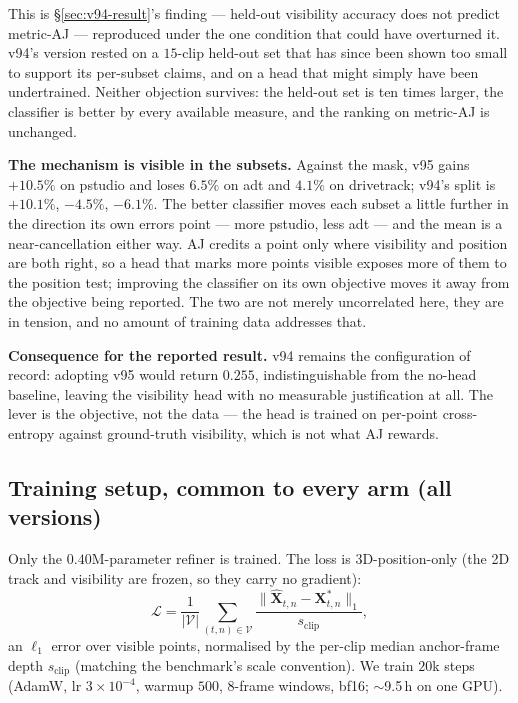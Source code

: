 \documentclass[11pt,a4paper]{article}
\begin{document}
This is \S\ref{sec:v94-result}'s finding --- held-out visibility accuracy does not predict
metric-AJ --- reproduced under the one condition that could have overturned it. v94's version
rested on a $15$-clip held-out set that has since been shown too small to support its per-subset
claims, and on a head that might simply have been undertrained. Neither objection survives: the
held-out set is ten times larger, the classifier is better by every available measure, and the
ranking on metric-AJ is unchanged.

\textbf{The mechanism is visible in the subsets.} Against the mask, v95 gains $+10.5\%$ on
pstudio and loses $6.5\%$ on adt and $4.1\%$ on drivetrack; v94's split is $+10.1\%$, $-4.5\%$,
$-6.1\%$. The better classifier moves each subset a little further in the direction its own
errors point --- more pstudio, less adt --- and the mean is a near-cancellation either way. AJ
credits a point only where visibility and position are both right, so a head that marks more
points visible exposes more of them to the position test; improving the classifier on its own
objective moves it away from the objective being reported. The two are not merely uncorrelated
here, they are in tension, and no amount of training data addresses that.

\textbf{Consequence for the reported result.} v94 remains the configuration of record: adopting
v95 would return $0.255$, indistinguishable from the no-head baseline, leaving the visibility head
with no measurable justification at all. The lever is the objective, not the data --- the head is
trained on per-point cross-entropy against ground-truth visibility, which is not what AJ rewards.

\subsection{Training setup, common to every arm (all versions)}
Only the $0.40$M-parameter refiner is trained. The loss is 3D-position-only (the 2D track and
visibility are frozen, so they carry no gradient):
\begin{equation}
\mathcal{L} = \frac{1}{|\mathcal{V}|}\sum_{(t,n)\in\mathcal{V}}
\frac{\lVert \hat{\mathbf X}_{t,n}-\mathbf X^{*}_{t,n}\rVert_1}{s_{\text{clip}}},
\end{equation}
an $\ell_1$ error over visible points, normalised by the per-clip median anchor-frame depth
$s_{\text{clip}}$ (matching the benchmark's scale convention). We train $20$k steps (AdamW,
lr $3\!\times\!10^{-4}$, warmup $500$, $8$-frame windows, bf16; $\sim$9.5\,h on one GPU).
\end{document}
